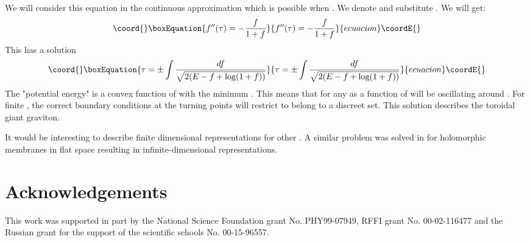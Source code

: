 \documentclass[a4paper,12pt]{article}
\begin{document}
We will consider this equation in the continuous approximation which is
possible when \coordHE{}. We denote \coordHE{} and substitute
\coordHE{}. We will get:
\begin{equation}\coord{}\boxEquation{
f''(\tau)=-{f\over 1+f}
}{
f''(\tau)=-{f\over 1+f}
}{ecuacion}\coordE{}\end{equation}
This has a solution
\begin{equation}\coord{}\boxEquation{
\tau=\pm\int{df\over\sqrt{2(E-f+\log(1+f))}}
}{
\tau=\pm\int{df\over\sqrt{2(E-f+\log(1+f))}}
}{ecuacion}\coordE{}\end{equation}
The "potential energy" \coordHE{} is a convex function of \coordHE{} with
the minimum \coordHE{}. This means that for any \coordHE{}  \coordHE{} as a function of \coordHE{}
will be oscillating around \coordHE{}. For finite \coordHE{}, the correct boundary conditions at
the turning points will restrict \coordHE{} to belong to a discreet set.
This solution describes the toroidal giant graviton.

It would be interesting to describe finite dimensional representations for
other \coordHE{}. A similar problem was solved in \cite{CornalbaTaylor} for holomorphic
membranes in flat space resulting in infinite-dimensional
representations.

\section{Acknowledgements}
This work was supported in part by the National Science Foundation grant
No. PHY99-07949, RFFI grant No. 00-02-116477 and the
Russian grant for the support of the scientific schools No. 00-15-96557.
\end{document}

